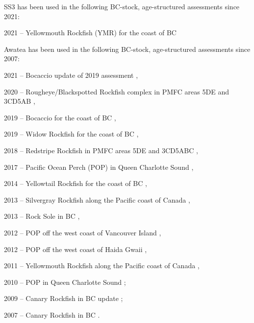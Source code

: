 \documentclass[11pt]{book}
\begin{document}
SS3 has been used in the following BC-stock, age-structured assessments since 2021:
\begin{itemize_csas}{}{}
  \item 2021 -- Yellowmouth Rockfish (YMR) for the coast of BC \citep{Starr-Haigh:2022_ymr}
\end{itemize_csas}

Awatea has been used in the following BC-stock, age-structured assessments since 2007:
\begin{itemize_csas}{}{}
  \item 2021 -- Bocaccio update of 2019 assessment \citep{DFO-SR:2022_bor},
  \item 2020 -- Rougheye/Blackspotted Rockfish complex in PMFC areas 5DE and 3CD5AB \citep{Starr-Haigh:2022_rebs},
  \item 2019 -- Bocaccio for the coast of BC \citep{Starr-Haigh:2022_bor},
  \item 2019 -- Widow Rockfish for the coast of BC \citep{Starr-Haigh:2021_wwr},
  \item 2018 -- Redstripe Rockfish in PMFC areas 5DE and 3CD5ABC \citep{Starr-Haigh:2021_rsr},
  \item 2017 -- Pacific Ocean Perch (POP) in Queen Charlotte Sound \citep{Haigh-etal:2018_pop5ABC},
  \item 2014 -- Yellowtail Rockfish for the coast of BC \citep{DFO-SAR:2015_ytr},
  \item 2013 -- Silvergray Rockfish along the Pacific coast of Canada \citep{Starr-etal:2016_sgr},
  \item 2013 -- Rock Sole in BC \citep{Holt-etal:2016_rol},
  \item 2012 -- POP off the west coast of Vancouver Island \citep{Edwards-etal:2014_pop3CD},
  \item 2012 -- POP off the west coast of Haida Gwaii \citep{Edwards-etal:2014_pop5DE},
  \item 2011 -- Yellowmouth Rockfish along the Pacific coast of Canada \citep{Edwards-etal:2012_ymr},
  \item 2010 -- POP in Queen Charlotte Sound \citep{Edwards-etal:2012_pop5ABC};
  \item 2009 -- Canary Rockfish in BC update \citep{DFO-SR:2009_car};
  \item 2007 -- Canary Rockfish in BC \citep{Stanley-etal:2009_car}.
\end{itemize_csas}
\end{document}
